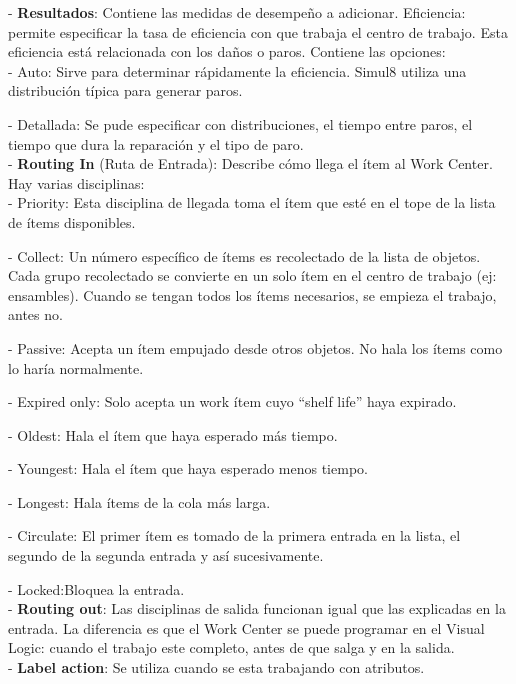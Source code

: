 \documentclass[runningheads]{llncs}
\begin{document}
- \textbf{Resultados}: Contiene las medidas de desempeño a adicionar.  
Eficiencia: permite especificar la tasa de eficiencia con que trabaja el centro de trabajo. Esta eficiencia está relacionada con los daños o paros. Contiene las opciones:  \\

- Auto: Sirve para determinar rápidamente la eficiencia. Simul8 utiliza una distribución típica para generar paros.

- Detallada: Se pude especificar con distribuciones, el tiempo entre paros, el tiempo que dura la reparación y el tipo de paro.  \\

- \textbf{Routing In} (Ruta de Entrada): Describe cómo llega el ítem al Work Center. Hay varias disciplinas:  \\

- Priority: Esta disciplina de llegada toma el ítem que esté en el tope de la lista de ítems disponibles. 

- Collect: Un número específico de ítems es recolectado de la lista de objetos. Cada grupo recolectado se convierte en un solo ítem en el centro de trabajo (ej: ensambles). Cuando se tengan todos los ítems necesarios, se empieza el trabajo, antes no. 

- Passive: Acepta un ítem empujado desde otros objetos. No hala los ítems como lo haría normalmente.

- Expired only: Solo acepta un work ítem cuyo “shelf life” haya expirado. 

- Oldest: Hala el ítem que haya esperado más tiempo.

- Youngest: Hala el ítem que haya esperado menos tiempo.  

- Longest: Hala ítems de la cola más larga.  

- Circulate: El primer ítem es tomado de la primera entrada en la lista, el segundo de la segunda entrada y así sucesivamente. 

- Locked:Bloquea la entrada. \\

- \textbf{Routing out}: Las disciplinas de salida funcionan igual que las explicadas en la entrada. La diferencia es que el Work Center se puede programar en el Visual Logic: cuando el trabajo este completo, antes de que salga y en la salida. \\

- \textbf{Label action}: Se utiliza cuando se esta trabajando con atributos. \\
\end{document}
